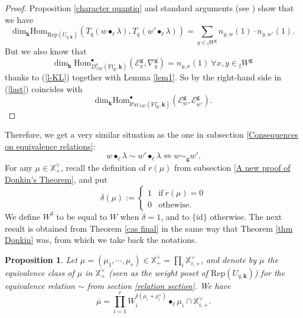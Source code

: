 \documentclass[11pt]{amsart}
\theoremstyle{plain}
\newtheorem{prop}[thm]{Proposition}
\theoremstyle{remark}
\numberwithin{equation}{section}
\begin{document}
	\begin{proof}
	 Proposition \ref{character quantiq} and standard arguments (see \cite[§6.2]{achar2016modular}) show that we have
	\begin{equation}\label{last}
	    \mathrm{dim}_\mathbf{k}\mathrm{Hom}_{\mathrm{Rep}(U_{q,\mathbf{k}})}(T_q(w\bullet_\ell\lambda),T_q(w'\bullet_\ell\lambda))=\sum_{y\in {_\mathrm{f}W}^\mathbf{g}}n_{y,w}(1)\cdot n_{y,w'}(1). 
	\end{equation}
	But we also know that 
	$$\mathrm{dim}_\mathbf{k}~\mathrm{Hom}^\bullet_{D^b_{\mathcal{IW}}(\mathrm{Fl}^{\circ}_{\mathbf{g}},\mathbf{k})}(\mathcal{E}_x^\mathbf{g},\nabla^\mathbf{g}_y)=n_{y,x}(1)~\forall x,y\in{_\mathrm{f}W}^\mathbf{g}$$
	thanks to (\ref{l-KL}) together with Lemma \ref{lem1}. So by \cite[Proposition 2.6]{2014} the right-hand side in (\ref{last}) coincides with $$\mathrm{dim}_\mathbf{k}\mathrm{Hom}^\bullet_{\mathrm{Par}_{\mathcal{IW}}(\mathrm{Fl}^{\circ}_{\mathbf{g}},\mathbf{k})}(\mathcal{E}_w^{\mathbf{g}},\mathcal{E}_{w'}^{\mathbf{g}}).$$
	\end{proof}
Therefore, we get a very similar situation as the one in subsection \ref{Consequences on equivalence relations}:
$$w\bullet_\ell\lambda\sim w'\bullet_\ell\lambda \Longleftrightarrow w\sim_\mathbf{g} w'.$$
For any $\mu\in\mathbb{X}^\vee_+$, recall the definition of $r(\mu)$ from subsection \ref{A new proof of Donkin's Theorem}, and put $$\delta(\mu):=\begin{cases}
				1 & \text{if}\ r(\mu)=0 \\
				0 & \text{othewise.}\
			\end{cases}$$ 
			We define $W^\delta$ to be equal to $W$ when $\delta=1$, and to $\{\mathrm{id}\}$ otherwise. The next result is obtained from Theorem \ref{cas final} in the same way that Theorem \ref{thm Donkin} was, from which we take back the notations.
\begin{prop}\label{block quantique}
Let $\mu=(\mu_1,\cdots,\mu_r)\in \mathbb{X}^\vee_+=\prod_i \mathbb{X}^\vee_{i,+}$, and denote by $\overline{\mu}$ the equivalence class of $\mu$ in $\mathbb{X}^\vee_+$ (seen as the weight poset of $\mathrm{Rep}(U_{q,\mathbf{k}})$) for the equivalence relation $\sim$ from  section \ref{relation section}. We have $$\overline{\mu}=\prod_{i=1}^r W_i^{\delta(\mu_i+\rho^\vee_i)}\bullet_{\ell}\mu_i\cap\mathbb{X}^\vee_{i,+}.$$ 
\end{prop}
\end{document}
